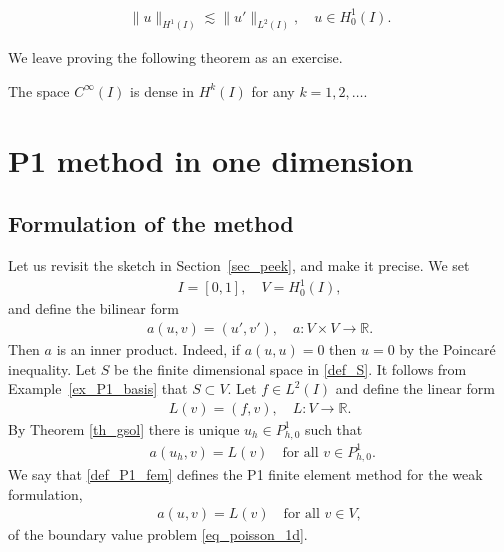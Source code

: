 \documentclass[12pt,oneside]{amsart}
\def\R{\mathbb R}
\begin{document}
\begin{proposition}\label{prop_poincare}
    \begin{align*}
\|u\|_{H^1(I)} \lesssim \|u'\|_{L^2(I)}, \quad u \in H_0^1(I).
    \end{align*}
\end{proposition}

We leave proving the following theorem as an exercise.  

\begin{theorem}[Density in $H^k$]\label{th_density_H2}
The space $C^\infty(I)$ is dense in $H^k(I)$ for any $k=1,2,\dots$.
\end{theorem}

\section{P1 method in one dimension}

\subsection{Formulation of the method}

Let us revisit the sketch in Section~\ref{sec_peek}, and make it precise.
We set 
    \begin{align*}
I = [0,1], \quad V = H_0^1(I),
    \end{align*}
and define the bilinear form
    \begin{align*}
a(u, v) = (u', v'), \quad a : V \times V \to \mathbb R.
    \end{align*}
Then $a$ is an inner product. Indeed,
if $a(u,u) = 0$ then $u=0$ by the Poincar\'e inequality.
Let $S$ be the finite dimensional space in \eqref{def_S}.
It follows from Example~\ref{ex_P1_basis} that $S \subset V$.
Let $f \in L^2(I)$ and define the linear form
    \begin{align*}
L(v) = (f, v), \quad L : V \to \R.
    \end{align*}
By Theorem \ref{th_gsol} there is unique $u_h \in P_{h,0}^1$ such that 
    \begin{align}\label{def_P1_fem}
\ \,
a(u_h,v) = L(v) \quad \text{for all $v \in P_{h,0}^1$}.
    \end{align}
We say that \eqref{def_P1_fem} defines the P1 finite element method for the weak formulation,
    \begin{align}\label{def_weak_form}
a(u, v) = L(v) \quad \text{for all $v \in V$},
    \end{align}
of the boundary value problem \eqref{eq_poisson_1d}.
\end{document}
